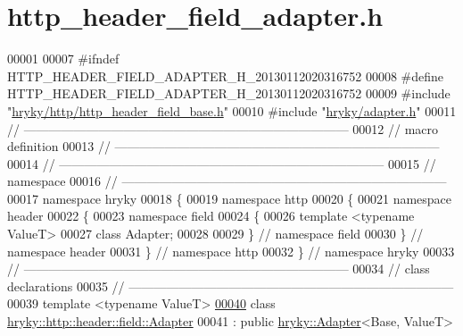 \hypertarget{http__header__field__adapter_8h_source}{\section{http\-\_\-header\-\_\-field\-\_\-adapter.\-h}
}

\begin{DoxyCode}
00001 
00007 \textcolor{preprocessor}{#ifndef HTTP\_HEADER\_FIELD\_ADAPTER\_H\_20130112020316752}
00008 \textcolor{preprocessor}{}\textcolor{preprocessor}{#define HTTP\_HEADER\_FIELD\_ADAPTER\_H\_20130112020316752}
00009 \textcolor{preprocessor}{}\textcolor{preprocessor}{#include "\hyperlink{http__header__field__base_8h}{hryky/http/http_header_field_base.h}"}
00010 \textcolor{preprocessor}{#include "\hyperlink{adapter_8h}{hryky/adapter.h}"}
00011 \textcolor{comment}{//
      ------------------------------------------------------------------------------}
00012 \textcolor{comment}{// macro definition}
00013 \textcolor{comment}{//
      ------------------------------------------------------------------------------}
00014 \textcolor{comment}{//
      ------------------------------------------------------------------------------}
00015 \textcolor{comment}{// namespace}
00016 \textcolor{comment}{//
      ------------------------------------------------------------------------------}
00017 \textcolor{keyword}{namespace }hryky
00018 \{
00019 \textcolor{keyword}{namespace }http
00020 \{
00021 \textcolor{keyword}{namespace }header
00022 \{
00023 \textcolor{keyword}{namespace }field
00024 \{
00026     \textcolor{keyword}{template} <\textcolor{keyword}{typename} ValueT>
00027     \textcolor{keyword}{class }Adapter;
00028 
00029 \} \textcolor{comment}{// namespace field}
00030 \} \textcolor{comment}{// namespace header}
00031 \} \textcolor{comment}{// namespace http}
00032 \} \textcolor{comment}{// namespace hryky}
00033 \textcolor{comment}{//
      ------------------------------------------------------------------------------}
00034 \textcolor{comment}{// class declarations}
00035 \textcolor{comment}{//
      ------------------------------------------------------------------------------}
00039 \textcolor{comment}{}\textcolor{keyword}{template} <\textcolor{keyword}{typename} ValueT>
\hypertarget{http__header__field__adapter_8h_source_l00040}{}\hyperlink{classhryky_1_1http_1_1header_1_1field_1_1_adapter}{00040} \textcolor{keyword}{class }\hyperlink{classhryky_1_1http_1_1header_1_1field_1_1_adapter}{hryky::http::header::field::Adapter}
00041     : \textcolor{keyword}{public} \hyperlink{classhryky_1_1_adapter}{hryky::Adapter}<Base, ValueT>

\end{DoxyCode}
